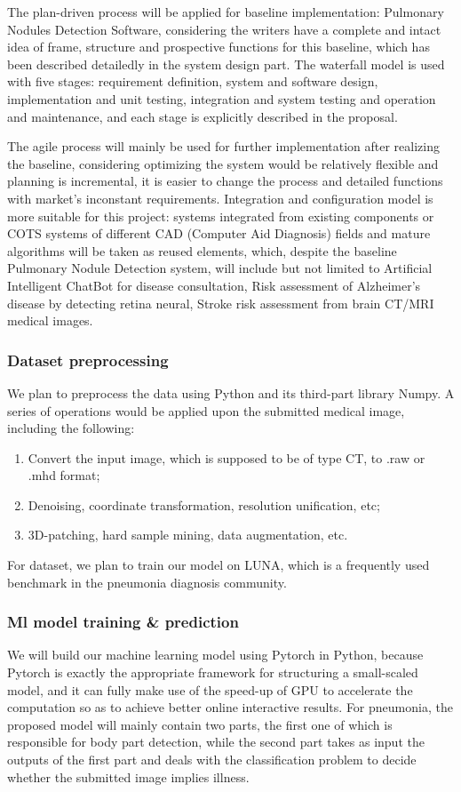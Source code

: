 \documentclass[11pt,bibliography=totocnumbered]{article}
\begin{document}
  The plan-driven process will be applied for baseline implementation: Pulmonary Nodules Detection Software, considering the writers have a complete and intact idea of frame, structure and prospective functions for this baseline, which has been described detailedly in the system design part. The waterfall model is used with five stages: requirement definition, system and software design, implementation and unit testing, integration and system testing and operation and maintenance, and each stage is explicitly described in the proposal.
  
  The agile process will mainly be used for further implementation after realizing the baseline, considering optimizing the system would be relatively flexible and planning is incremental, it is easier to change the process and detailed functions with market’s inconstant requirements. Integration and configuration model is more suitable for this project: systems integrated from existing components or COTS systems of different CAD (Computer Aid Diagnosis) fields and mature algorithms will be taken as reused elements, which, despite the baseline Pulmonary Nodule Detection system, will include but not limited to Artificial Intelligent ChatBot for disease consultation, Risk assessment of Alzheimer's disease by detecting retina neural, Stroke risk assessment from brain CT/MRI medical images.
  
  
  
  \subsubsection{Dataset preprocessing}
  
  We plan to preprocess the data using Python and its third-part library Numpy. A series of operations would be applied upon the submitted medical image, including the following:
  \begin{enumerate}
  	\item Convert the input image, which is supposed to be of type CT, to .raw or .mhd format;
  	\item Denoising, coordinate transformation, resolution unification, etc;
  	\item   3D-patching, hard sample mining, data augmentation, etc.
  \end{enumerate}
  For dataset, we plan to train our model on LUNA, which is a frequently used benchmark in the pneumonia diagnosis community.
  
  
  \subsubsection{Ml model training \& prediction}
  We will build our machine learning model using Pytorch in Python, because Pytorch is exactly the appropriate framework for structuring a small-scaled model, and it can fully make use of the speed-up of GPU to accelerate the computation so as to achieve better online interactive results. For pneumonia, the proposed model will mainly contain two parts, the first one of which is responsible for body part detection, while the second part takes as input the outputs of the first part and deals with the classification problem to decide whether the submitted image implies illness. 
  
\end{document}
